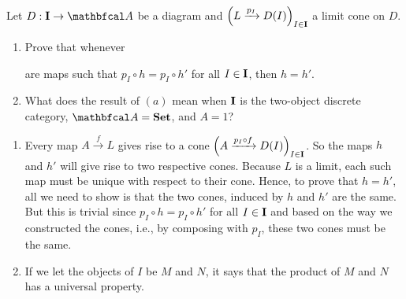 \documentclass[11pt,a4paper]{article}
\begin{document}
\begin{exercise}
    Let $D:\bcat{I}\to\cat{A}$ be a diagram and $\Big( L\xrightarrow{p_I} D(I) \Big)_{I\in\mathbf{I}}$ a limit cone on $D$.
    \begin{enumerate}[label=(\alph*)]
        \item Prove that whenever  are maps such that $p_I\circ h=p_I\circ h'$ for all $I\in\mathbf{I}$, then $h=h'$.
        \item What does the result of $(a)$ mean when $\mathbf{I}$ is the two-object discrete category, $\cat{A}=\bcat{Set}$, and $A=1$?
    \end{enumerate}
\end{exercise}
\begin{solution}\leavevmode
    \begin{enumerate}[label=(\alph*)]
        \item Every map $A\xrightarrow{f}L$ gives rise to a cone $\Big( A\xrightarrow{p_I\circ f}D(I) \Big)_{I\in\mathbf{I}}$. So the maps $h$ and $h'$ will give rise to two respective cones. Because $L$ is a limit, each such map must be unique with respect to their cone. Hence, to prove that $h=h'$, all we need to show is that the two cones, induced by $h$ and $h'$ are the same. But this is trivial since $p_I\circ h=p_I\circ h'$ for all $I\in\mathbf{I}$ and based on the way we constructed the cones, i.e., by composing with $p_I$, these two cones must be the same.
        \item If we let the objects of $I$ be $M$ and $N$, it says that the product of $M$ and $N$ has a universal property.
    \end{enumerate}
\end{solution}
\end{document}
